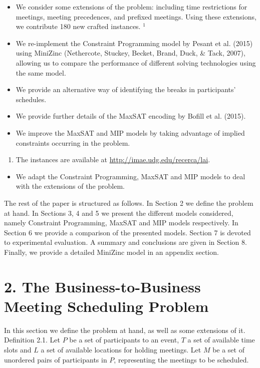 \documentclass[10pt]{article}
\begin{document}
\begin{itemize}
  \item We consider some extensions of the problem: including time restrictions for meetings, meeting precedences, and prefixed meetings. Using these extensions, we contribute 180 new crafted instances. ${ }^{1}$
  \item We re-implement the Constraint Programming model by Pesant et al. (2015) using MiniZinc (Nethercote, Stuckey, Becket, Brand, Duck, \& Tack, 2007), allowing us to compare the performance of different solving technologies using the same model.
  \item We provide an alternative way of identifying the breaks in participants' schedules.
  \item We provide further details of the MaxSAT encoding by Bofill et al. (2015).
  \item We improve the MaxSAT and MIP models by taking advantage of implied constraints occurring in the problem.
\end{itemize}

\begin{enumerate}
  \item The instances are available at \href{http://imae.udg.edu/recerca/lai}{http://imae.udg.edu/recerca/lai}.
\end{enumerate}

\begin{itemize}
  \item We adapt the Constraint Programming, MaxSAT and MIP models to deal with the extensions of the problem.
\end{itemize}

The rest of the paper is structured as follows. In Section 2 we define the problem at hand. In Sections 3, 4 and 5 we present the different models considered, namely Constraint Programming, MaxSAT and MIP models respectively. In Section 6 we provide a comparison of the presented models. Section 7 is devoted to experimental evaluation. A summary and conclusions are given in Section 8. Finally, we provide a detailed MiniZinc model in an appendix section.

\section*{2. The Business-to-Business Meeting Scheduling Problem}
In this section we define the problem at hand, as well as some extensions of it.\\
Definition 2.1. Let $P$ be a set of participants to an event, $T$ a set of available time slots and $L$ a set of available locations for holding meetings. Let $M$ be a set of unordered pairs of participants in $P$, representing the meetings to be scheduled.
\end{document}
